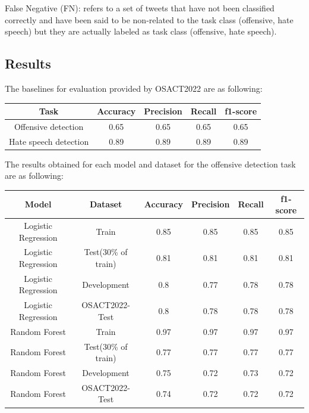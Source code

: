\documentclass[conference]{IEEEtran}
\begin{document}
False Negative (FN): refers to a set of tweets that have not been classified correctly and have been said to be non-related to the task class (offensive, hate speech) but they are actually labeled as task class (offensive, hate speech).

\subsection{Results}

The baselines for evaluation provided by OSACT2022 are as following:

\begin{table}[htbp]
	\begin{tabular}{|c|c|c|c|c|}
		\hline
		Task & Accuracy & Precision & Recall & f1-score \\ \hline
		Offensive detection & 0.65 & 0.65 & 0.65 & 0.65 \\ \hline
		Hate speech detection & 0.89 & 0.89 & 0.89 & 0.89 \\ \hline
	\end{tabular}
\end{table}

The results obtained for each model and dataset for the offensive detection task are as following:

\begin{table}[htbp]
	\begin{tabular}{|c|c|c|c|c|c|}
		\hline
		Model & Dataset & Accuracy & Precision & Recall & f1-score \\ \hline
		Logistic Regression & Train & 0.85 & 0.85 & 0.85 & 0.85 \\ \hline
		Logistic Regression & Test(30\% of train) & 0.81 & 0.81 & 0.81 & 0.81 \\ \hline
		Logistic Regression & Development & 0.8 & 0.77 & 0.78 & 0.78 \\ \hline
		Logistic Regression & OSACT2022-Test & 0.8 & 0.78 & 0.78 & 0.78 \\ \hline
		Random Forest & Train & 0.97 & 0.97 & 0.97 & 0.97 \\ \hline
		Random Forest & Test(30\% of train) & 0.77 & 0.77 & 0.77 & 0.77 \\ \hline
		Random Forest & Development & 0.75 & 0.72 & 0.73 & 0.72 \\ \hline
		Random Forest & OSACT2022-Test & 0.74 & 0.72 & 0.72 & 0.72 \\ \hline
	\end{tabular}
\end{table}
\end{document}
